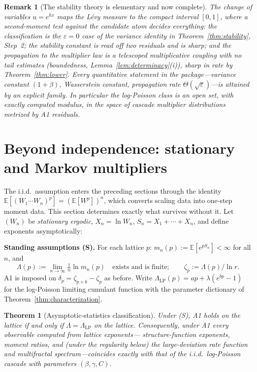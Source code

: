 \documentclass[pdflatex,sn-mathphys-num]{sn-jnl}
\theoremstyle{thmstyleone}
\newtheorem{theorem}{Theorem}
\theoremstyle{thmstyletwo}
\newtheorem*{remark}{Remark}
\theoremstyle{thmstylethree}
\begin{document}
\begin{remark}[The stability theory is elementary and now
complete]
The change of variables $u = e^{kx}$ maps the L\'evy measure to the
compact interval $[0,1]$, where a second-moment test against the
candidate atom decides everything: the classification is the
$\varepsilon = 0$ case of the variance identity in
Theorem~\ref{thm:stability}, Step~2; the stability constant is read
off two residuals and is sharp; and the propagation to the
multiplier law is a telescoped multiplicative coupling with no tail
estimates (boundedness, Lemma~\ref{lem:determinacy}(i)), sharp in
rate by Theorem~\ref{thm:lower}.  Every quantitative statement in
the package---variance constant $(1+\beta)$, Wasserstein constant,
propagation rate $\Theta(\sqrt\varepsilon)$---is attained by an
explicit family.  In particular the log-Poisson class is an open
set, with exactly computed modulus, in the space of cascade
multiplier distributions metrized by A1 residuals.
\end{remark}


\section{Beyond independence: stationary and Markov multipliers}
\label{sec:beyond}

The i.i.d.\ assumption enters the preceding sections through the
identity $\mathbb{E}[(W_1\cdots W_n)^p] = (\mathbb{E}[W^p])^n$,
which converts scaling data into one-step moment data.  This section
determines exactly what survives without it.  Let $(W_n)$ be
\emph{stationary ergodic}, $X_n = \ln W_n$, $S_n = X_1 + \cdots +
X_n$, and define exponents asymptotically:

\smallskip
\noindent\textbf{Standing assumptions (S).}  For each lattice $p$:
$m_n(p) := \mathbb{E}[e^{pS_n}] < \infty$ for all $n$, and
\[
  \Lambda(p) := \lim_{n\to\infty}\tfrac1n\ln m_n(p)
  \quad\text{exists and is finite};
  \qquad \zeta_p := \Lambda(p)/\ln r .
\]
A1 is imposed on $\delta_p = \zeta_{p+k}-\zeta_p$ as before.  Write
$\Lambda_{\mathrm{LP}}(p) = ap + \lambda(e^{bp}-1)$ for the
log-Poisson limiting cumulant function with the parameter dictionary
of Theorem~\ref{thm:characterization}.

\begin{theorem}[Asymptotic-statistics classification]\label{thm:cgflevel}
Under \textup{(S)}, A1 holds on the lattice if and only if
$\Lambda = \Lambda_{\mathrm{LP}}$ on the lattice.  Consequently,
under A1 every observable computed from lattice exponents---%
structure-function exponents, moment ratios, and (under the
regularity below) the large-deviation rate function and multifractal
spectrum---coincides exactly with that of the i.i.d.\ log-Poisson
cascade with parameters $(\beta, \gamma, C)$.
\end{theorem}
\end{document}
